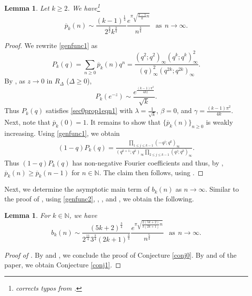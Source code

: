 \documentclass[11pt,reqno,a4paper]{amsart}
\renewcommand{\b}{\beta}
\newcommand{\g}{\gamma}
\renewcommand{\l}{\lambda}
\renewcommand{\(}{\left\(}
\renewcommand{\)}{\right\)}
\numberwithin{equation}{section}
\theoremstyle{plain}
\newtheorem{lemma}[theorem]{Lemma}
\theoremstyle{definition} %
\numberwithin{equation}{section}
\begin{document}
\begin{lemma}\label{overptnlem1}
	Let $k\ge 2$. We have\footnote{ corrects typos from \cite[equation (3.18)]{PZZ}.}
	\[
	\overline{p}_k(n)\sim \frac{\left(k-1\right)^{\frac 14}}{2^{\frac 32}k^{\frac 34} }\frac{e^{\pi\sqrt{\frac{k-1}k n}}}{n^{\frac 34}}\ \ \text{ as}\ \ n\to \infty.
	\]
\end{lemma}
\begin{proof} 
We rewrite \eqref{genfunc1} as 
\begin{equation*} 
P_k(q)=\sum_{n\ge 0}\overline{p}_k(n)q^n=\frac{\left(q^2;q^2\right)_{\infty}\left(q^{k};q^{k}\right)^2_{\infty}}{\left(q\right)^2_{\infty}\left(q^{2k};q^{2k}\right)_{\infty}}.
\end{equation*}
By , as $z\to 0$ in $R_{\Delta}$ ($\Delta\ge 0$), 
	\[
	P_k(e^{-z})\sim 
	\frac{e^{\frac{(k-1)\pi^2}{4kz}}}{\sqrt k}.
	\]
	Thus $P_k(q)$ satisfies \eqref{sec0prop1eqn1} with $\l=\frac{1}{\sqrt{k}}$, $\b=0$, and $\g=\frac{(k-1)\pi^2}{4k}$. Next, note that $\overline{p}_k(0)=1$. It remains to show that $\{\overline{p}_k(n)\}_{n\ge 0}$ is weakly increasing. Using \eqref{genfunc1}, we obtain  
	\begin{align*}
\left(1-q\right)P_k(q)
=\frac{\prod_{1\le j\le k-1}\left(-q^j;q^k\right)_{\infty}}{\left(q^{k+1};q^k\right)_{\infty}\prod_{2\le j\le k-1}\left(q^j;q^k\right)_{\infty}}.
	\end{align*}
Thus $(1-q)P_k(q)$ has non-negative Fourier coefficients and thus, by , $\overline{p}_k(n)\ge \overline{p}_k(n-1)$ for $n\in \mathbb{N}$. The claim then follows, using .\qedhere  
\end{proof}



Next, we determine the asymptotic main term of $b_k(n)$ as $n\to \infty$. Similar to the proof of , using \eqref{genfunc2}, , , and , we obtain the following.

\begin{lemma}\label{brokenlem1}
	For $k\in \mathbb{N}$, we have 
	\[
	b_k(n)\sim \frac{(5k+2)^{\frac 34}}{2^{\frac{11}4} 3^{\frac 34} (2k+1)^{\frac 34}}\frac{e^{\pi\sqrt{\frac{2(5k+2)}{3(2k+1)}n}}}{n^{\frac 54}}\ \ \text{ as}\ \ n\to \infty.
	\]
\end{lemma}


\begin{proof}[Proof of ]
	By  and , we conclude the proof of Conjecture \ref{conj0}. By  and  of the paper, we obtain Conjecture \ref{conj1}.\qedhere   
\end{proof}
\end{document}
